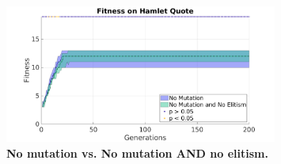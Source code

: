\documentclass{article}
\begin{document}
		\hspace{-5mm}
\begin{figure}[h!]

		\includegraphics[width=0.8\textwidth]{img/5_vsNoMutNoElite.png}
	\caption
	{		\textbf{No mutation vs. No mutation AND no elitism.}}
\end{figure}
\newpage
\end{document}
